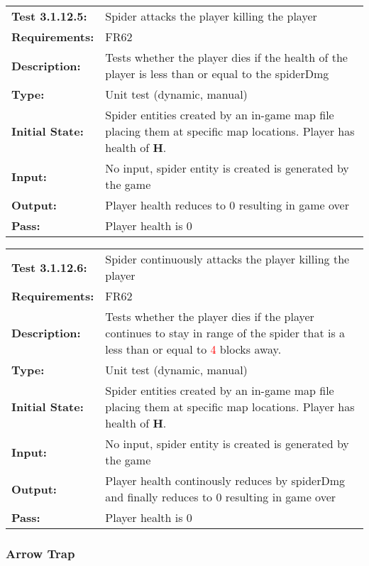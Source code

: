 \documentclass[12pt, titlepage]{article}
\begin{document}
\begin{tabular}{|l|p{10cm}|}
    \hline
    \bf{Test} 3.1.12.5: & Spider attacks the player killing the player\ \\
    \bf{Requirements}: & FR62 \\
    \bf{Description}: & Tests whether the player dies if the health of the player is less than or equal to the spiderDmg  \\
    \bf{Type}:  &  Unit test (dynamic, manual)   \\
     
    \bf{Initial State}: & Spider entities created by an in-game map file placing them at specific map locations. Player has health of $\mathbf{H}$. \\
    \bf{Input}: & No input, spider entity is created is generated by the game \\
    \bf{Output}: & Player health reduces to 0 resulting in game over\\
    \bf{Pass}: & Player health is 0\\
    \hline
\end{tabular}

\begin{tabular}{|l|p{10cm}|}
    \hline
    \bf{Test} 3.1.12.6: & Spider continuously attacks the player killing the player\ \\
    \bf{Requirements}: & FR62 \\
    \bf{Description}: & Tests whether the player dies if the player continues to stay in range of the spider that is a less than or equal to \textcolor{red}{4} blocks away.\\
    \bf{Type}:  &  Unit test (dynamic, manual)   \\
    \bf{Initial State}: & Spider entities created by an in-game map file placing them at specific map locations. Player has health of $\mathbf{H}$. \\
    \bf{Input}: & No input, spider entity is created is generated by the game \\
    \bf{Output}: & Player health continously reduces by spiderDmg and finally reduces to 0 resulting in game over\\
    \bf{Pass}: & Player health is 0\\
    \hline
\end{tabular}

\subsubsection{Arrow Trap}
\end{document}
